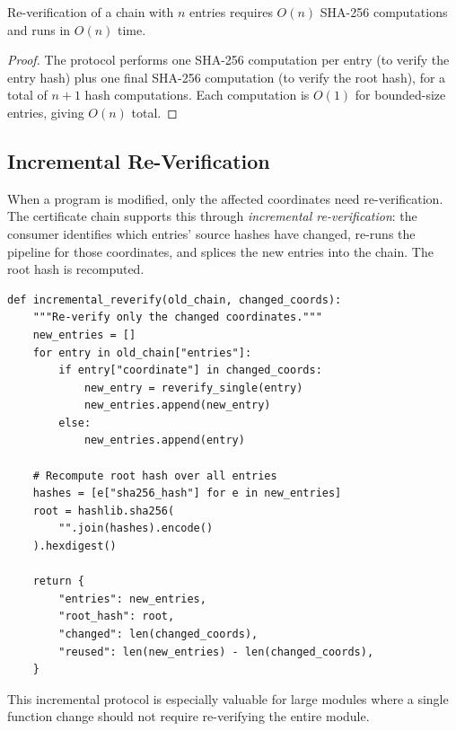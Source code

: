 \documentclass[11pt]{article}
\begin{document}
\begin{lemma}\label{lem:reverify-time}
Re-verification of a chain with $n$ entries requires $O(n)$ SHA-256
computations and runs in $O(n)$ time.
\end{lemma}

\begin{proof}
The protocol performs one SHA-256 computation per entry (to verify
the entry hash) plus one final SHA-256 computation (to verify the
root hash), for a total of $n + 1$ hash computations.  Each
computation is $O(1)$ for bounded-size entries, giving $O(n)$
total.
\end{proof}

\subsection{Incremental Re-Verification}

When a program is modified, only the affected coordinates need
re-verification.  The certificate chain supports this through
\emph{incremental re-verification}: the consumer identifies which
entries' source hashes have changed, re-runs the pipeline for
those coordinates, and splices the new entries into the chain.
The root hash is recomputed.

\begin{lstlisting}[style=jugeo-python,caption={Incremental re-verification.}]
def incremental_reverify(old_chain, changed_coords):
    """Re-verify only the changed coordinates."""
    new_entries = []
    for entry in old_chain["entries"]:
        if entry["coordinate"] in changed_coords:
            new_entry = reverify_single(entry)
            new_entries.append(new_entry)
        else:
            new_entries.append(entry)

    # Recompute root hash over all entries
    hashes = [e["sha256_hash"] for e in new_entries]
    root = hashlib.sha256(
        "".join(hashes).encode()
    ).hexdigest()

    return {
        "entries": new_entries,
        "root_hash": root,
        "changed": len(changed_coords),
        "reused": len(new_entries) - len(changed_coords),
    }
\end{lstlisting}

This incremental protocol is especially valuable for large modules
where a single function change should not require re-verifying the
entire module.

\end{document}
